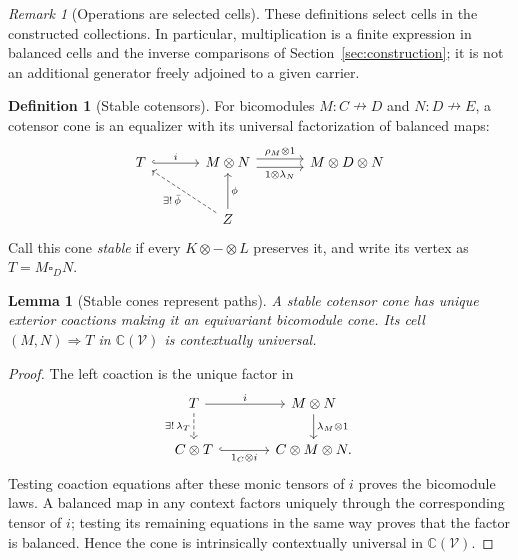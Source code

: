 \documentclass[11pt,a4paper]{article}
\newtheorem{lemma}[theorem]{Lemma}
\theoremstyle{definition}
\newtheorem{definition}[theorem]{Definition}
\theoremstyle{remark}
\newtheorem{remark}[theorem]{Remark}
\numberwithin{equation}{section}
\newcommand{\V}{\mathcal V}
\newcommand{\Ccal}{\mathbb C}
\newcommand{\harr}{\mathrel{\nrightarrow}}
\newcommand{\cell}{\mathrel{\Longrightarrow}}
\begin{document}
\begin{remark}[Operations are selected cells]
These definitions select cells in the constructed collections. In
particular, multiplication is a finite expression in balanced cells and
the inverse comparisons of Section~\ref{sec:construction}; it is not an
additional generator freely adjoined to a given carrier.
\end{remark}

\begin{definition}[Stable cotensors]\label{def:stable}
For bicomodules $M:C\harr D$ and $N:D\harr E$, a cotensor cone is
an equalizer with its universal factorization of balanced maps:
\begin{equation}\label{eq:stable}
\begin{tikzcd}[column sep=3.4em,row sep=2.6em]
T \arrow[r,hook,"i"] &
M\otimes N
  \arrow[r,shift left=.7ex,"\rho_M\otimes1"]
  \arrow[r,shift right=.7ex,"1\otimes\lambda_N"'] &
M\otimes D\otimes N\\
& Z \arrow[u,"\phi"'] \arrow[ul,dashed,"\exists!\,\bar\phi"] &
\end{tikzcd}
\end{equation}
Call this cone \emph{stable} if every $K\otimes-\otimes L$ preserves it,
and write its vertex as $T=M\square_D N$.
\end{definition}

\begin{lemma}[Stable cones represent paths]\label{lem:stable}
A stable cotensor cone has unique exterior coactions making it an
equivariant bicomodule cone. Its cell $(M,N)\cell T$ in $\Ccal(\V)$
is contextually universal.
\end{lemma}
\begin{proof}
The left coaction is the unique factor in
\[
\begin{tikzcd}[column sep=3.6em]
T \arrow[r,"i"] \arrow[d,dashed,"\exists!\,\lambda_T"'] &
M\otimes N \arrow[d,"\lambda_M\otimes1"]\\
C\otimes T \arrow[r,hook,"1_C\otimes i"'] &
C\otimes M\otimes N.
\end{tikzcd}
\]
Testing coaction equations after these monic tensors of $i$ proves the
bicomodule laws. A balanced map in any context factors uniquely through
the corresponding tensor of $i$; testing its remaining equations in the
same way proves that the factor is balanced. Hence the cone is
intrinsically contextually universal in $\Ccal(\V)$.
\end{proof}
\end{document}
